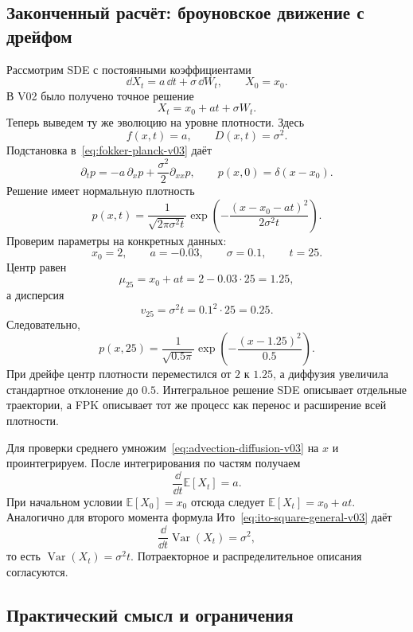 \subsection{Законченный расчёт: броуновское движение с дрейфом}

Рассмотрим SDE с постоянными коэффициентами
\begin{equation}
\label{eq:drifted-brownian-sde-v03}
\dd X_t
=
a\,\dd t
+
\sigma\,\dd W_t,
\qquad
X_0=x_0.
\end{equation}
В V02 было получено точное решение
\[
X_t=x_0+at+\sigma W_t.
\]
Теперь выведем ту же эволюцию на уровне плотности. Здесь
\[
f(x,t)=a,
\qquad
D(x,t)=\sigma^2.
\]
Подстановка в~\eqref{eq:fokker-planck-v03} даёт
\begin{equation}
\label{eq:advection-diffusion-v03}
\partial_t p
=
-a\,\partial_x p
+
\frac{\sigma^2}{2}\partial_{xx}p,
\qquad
p(x,0)=\delta(x-x_0).
\end{equation}
Решение имеет нормальную плотность
\begin{equation}
\label{eq:drifted-brownian-density-v03}
p(x,t)
=
\frac{1}{\sqrt{2\pi\sigma^2t}}
\exp\left(
-\frac{(x-x_0-at)^2}{2\sigma^2t}
\right).
\end{equation}
Проверим параметры на конкретных данных:
\[
x_0=2,
\qquad
a=-0.03,
\qquad\sigma=0.1,
\qquad t=25.
\]
Центр равен
\[
\mu_{25}=x_0+a t=2-0.03\cdot25=1.25,
\]
а дисперсия
\[
v_{25}=\sigma^2t=0.1^2\cdot25=0.25.
\]
Следовательно,
\begin{equation}
\label{eq:worked-density-v03}
p(x,25)
=
\frac{1}{\sqrt{0.5\pi}}
\exp\left(
-\frac{(x-1.25)^2}{0.5}
\right).
\end{equation}
При дрейфе центр плотности переместился от $2$ к $1.25$, а диффузия увеличила стандартное отклонение до $0.5$. Интегральное решение SDE описывает отдельные траектории, а FPK описывает тот же процесс как перенос и расширение всей плотности.

Для проверки среднего умножим~\eqref{eq:advection-diffusion-v03} на $x$ и проинтегрируем. После интегрирования по частям получаем
\[
\frac{\dd}{\dd t}\mathbb E[X_t]=a.
\]
При начальном условии $\mathbb E[X_0]=x_0$ отсюда следует $\mathbb E[X_t]=x_0+at$. Аналогично для второго момента формула Ито~\eqref{eq:ito-square-general-v03} даёт
\[
\frac{\dd}{\dd t}\operatorname{Var}(X_t)=\sigma^2,
\]
то есть $\operatorname{Var}(X_t)=\sigma^2t$. Потраекторное и распределительное описания согласуются.

\subsection{Практический смысл и ограничения}

